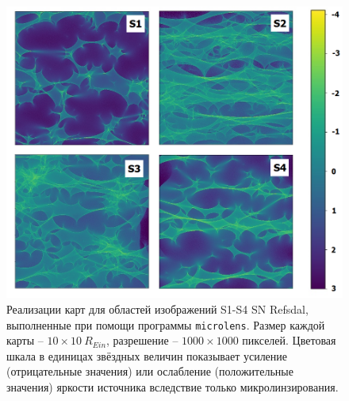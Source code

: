 \begin{figure}[H]
    \centering
	\includegraphics[scale=0.6]{pics/s1s4.png}
	\caption{Реализации карт для областей изображений S1-S4 SN Refsdal, выполненные при помощи программы {\tt{microlens}}. Размер каждой карты -- $10 \times 10 \ R_{Ein} $, разрешение -- $1000 \times 1000 $ пикселей. Цветовая шкала в единицах звёздных величин показывает усиление (отрицательные значения) или ослабление (положительные значения) яркости источника вследствие только микролинзирования. \label{fig:s1s4}} 
\end{figure}
